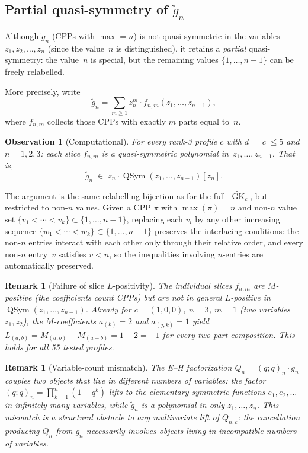 \documentclass[11pt]{article}
\newtheorem{remark}[theorem]{Remark}
\newtheorem{observation}[theorem]{Observation}
\newcommand{\GK}{\operatorname{GK}}
\newcommand{\qpochn}[3]{(#1;#2)_{#3}}
\newcommand{\QSym}{\operatorname{QSym}}
\begin{document}
\subsection{Partial quasi-symmetry of $\tilde{g}_n$}
\label{sec:partial-qsym}

Although $\tilde{g}_n$ (CPPs with $\max = n$) is not
quasi-symmetric in the variables $z_1, z_2, \ldots, z_n$
(since the value~$n$ is distinguished), it retains a
\emph{partial} quasi-symmetry: the value~$n$ is special,
but the remaining values $\{1, \ldots, n-1\}$ can be
freely relabelled.

More precisely, write
\[
  \tilde{g}_n
  = \sum_{m \geq 1} z_n^m \cdot f_{n,m}(z_1, \ldots, z_{n-1}),
\]
where $f_{n,m}$ collects those CPPs with exactly $m$ parts
equal to~$n$.

\begin{observation}[Computational]\label{obs:partial-qsym}
For every rank-3 profile $c$ with $d = |c| \leq 5$ and
$n = 1, 2, 3$: each slice $f_{n,m}$ is a quasi-symmetric
polynomial in~$z_1, \ldots, z_{n-1}$. That is,
\[
  \tilde{g}_n \;\in\; z_n \cdot \QSym(z_1, \ldots, z_{n-1})[z_n].
\]
\end{observation}

The argument is the same relabelling bijection as for the
full~$\widetilde{\GK}_c$, but restricted to non-$n$ values.
Given a CPP $\pi$ with $\max(\pi) = n$ and non-$n$ value
set $\{v_1 < \cdots < v_k\} \subset \{1, \ldots, n-1\}$,
replacing each $v_i$ by any other increasing sequence
$\{w_1 < \cdots < w_k\} \subset \{1, \ldots, n-1\}$
preserves the interlacing conditions: the non-$n$ entries
interact with each other only through their relative order,
and every non-$n$ entry~$v$ satisfies $v < n$, so the
inequalities involving $n$-entries are automatically preserved.

\begin{remark}[Failure of slice $L$-positivity]
The individual slices $f_{n,m}$ are $M$-positive
(the coefficients count CPPs) but are \emph{not} in general
$L$-positive in $\QSym(z_1, \ldots, z_{n-1})$.
Already for $c = (1,0,0)$, $n = 3$, $m = 1$
(two variables $z_1, z_2$), the $M$-coefficients
$a_{(k)} = 2$ and $a_{(j,k)} = 1$ yield
$L_{(a,b)} = M_{(a,b)} - M_{(a+b)} = 1 - 2 = -1$
for every two-part composition. This holds for all
55 tested profiles.
\end{remark}

\begin{remark}[Variable-count mismatch]
The E--H factorization $Q_n = \qpochn{q}{q}{n} \cdot g_n$
couples two objects that live in different numbers of
variables: the factor $\qpochn{q}{q}{n} = \prod_{k=1}^{n}(1-q^k)$
lifts to the elementary symmetric functions $e_1, e_2, \ldots$
in \emph{infinitely many} variables, while $\tilde{g}_n$
is a polynomial in only $z_1, \ldots, z_n$. This mismatch
is a structural obstacle to any multivariate lift of
$Q_{n,c}$: the cancellation producing $Q_n$ from $g_n$
necessarily involves objects living in incompatible
numbers of variables.
\end{remark}
\end{document}
